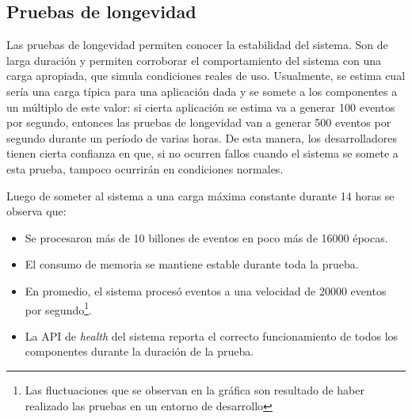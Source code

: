 \documentclass[a4paper,10pt, oneside]{article}
\begin{document}
\subsection{Pruebas de longevidad}
Las pruebas de longevidad permiten conocer la estabilidad del sistema. Son de larga duración y permiten corroborar el comportamiento del sistema con una carga apropiada, que simula condiciones reales de uso. Usualmente, se estima cual sería una carga típica para una aplicación dada y se somete a los componentes a un múltiplo de este valor: si cierta aplicación se estima va a generar 100 eventos por segundo, entonces las pruebas de longevidad van a generar 500 eventos por segundo durante un período de varias horas. De esta manera, los desarrolladores tienen cierta confianza en que, si no ocurren fallos cuando el sistema se somete a esta prueba, tampoco ocurrirán en condiciones normales.

Luego de someter al sistema a una carga máxima constante durante 14 horas se observa que:
\begin{itemize}
	\item Se procesaron más de 10 billones de eventos en poco más de 16000 épocas.
	\item El consumo de memoria se mantiene estable durante toda la prueba.
	\item En promedio, el sistema procesó eventos a una velocidad de 20000 eventos por segundo\footnote{Las fluctuaciones que se observan en la gráfica son resultado de haber realizado las pruebas en un entorno de desarrollo}.
	\item La API de \textit{health} del sistema reporta el correcto funcionamiento de todos los componentes durante la duración de la prueba.
\end{itemize}
\end{document}
